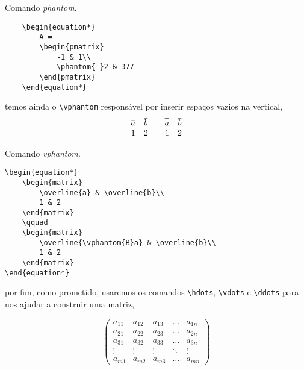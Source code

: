 \begin{programcode}{Comando \emph{phantom}.}
\begin{verbatim}
    \begin{equation*}
        A = 
        \begin{pmatrix}
            -1 & 1\\
            \phantom{-}2 & 377
        \end{pmatrix}     
    \end{equation*}
\end{verbatim}
\end{programcode}

\noindent temos ainda o \verb|\vphantom| respons\'{a}vel por inserir espa\c cos vazios na vertical,
\begin{equation*} 
    \begin{matrix}
        \overline{a} & \overline{b}\\
        1 & 2
    \end{matrix}  
    \qquad
    \begin{matrix}
        \overline{\vphantom{B}a} & \overline{b}\\
        1 & 2
    \end{matrix}    
\end{equation*} 

\begin{programcode}{Comando \emph{vphantom}.}
\begin{verbatim}
\begin{equation*} 
    \begin{matrix}
        \overline{a} & \overline{b}\\
        1 & 2
    \end{matrix}  
    \qquad
    \begin{matrix}
        \overline{\vphantom{B}a} & \overline{b}\\
        1 & 2
    \end{matrix}    
\end{equation*}
\end{verbatim}
\end{programcode}

\noindent por fim, como prometido, usaremos os comandos \verb|\hdots|, \verb|\vdots| e \verb|\ddots| para nos ajudar a construir uma matriz,

\begin{equation*}
    \begin{pmatrix}
        a_{11} & a_{12} & a_{13} & \hdots & a_{1n}\\
        a_{21} & a_{22} & a_{23} & \hdots & a_{2n}\\
        a_{31} & a_{32} & a_{33} & \hdots & a_{3n}\\
        \vdots & \vdots & \vdots & \ddots & \vdots\\
        a_{m1} & a_{m2} & a_{m3} & \hdots & a_{mn}
    \end{pmatrix}
\end{equation*}

